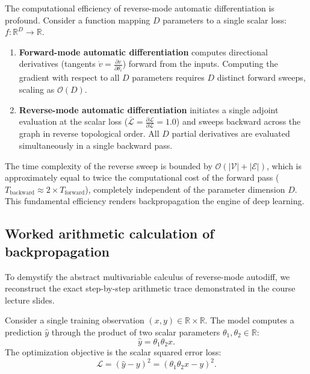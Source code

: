 \documentclass[../../../main.tex]{subfiles}
\begin{document}
The computational efficiency of reverse-mode automatic differentiation is profound. Consider a function mapping $D$ parameters to a single scalar loss: $f: \mathbb{R}^D \to \mathbb{R}$.
\begin{enumerate}[label=(\roman*)]
    \item \textbf{Forward-mode automatic differentiation} computes directional derivatives (tangents $\dot{v} = \frac{\partial v}{\partial \theta_i}$) forward from the inputs. Computing the gradient with respect to all $D$ parameters requires $D$ distinct forward sweeps, scaling as $\mathcal{O}(D)$.
    \item \textbf{Reverse-mode automatic differentiation} initiates a single adjoint evaluation at the scalar loss ($\bar{\mathcal{L}} = \frac{\partial \mathcal{L}}{\partial \mathcal{L}} = 1.0$) and sweeps backward across the graph in reverse topological order. All $D$ partial derivatives are evaluated simultaneously in a single backward pass.
\end{enumerate}
The time complexity of the reverse sweep is bounded by $\mathcal{O}(|\mathcal{V}| + |\mathcal{E}|)$, which is approximately equal to twice the computational cost of the forward pass ($T_{\text{backward}} \approx 2 \times T_{\text{forward}}$), completely independent of the parameter dimension $D$. This fundamental efficiency renders backpropagation the engine of deep learning.

\subsection{Worked arithmetic calculation of backpropagation}
\label{subsec:worked_backprop_arithmetic}

To demystify the abstract multivariable calculus of reverse-mode autodiff, we reconstruct the exact step-by-step arithmetic trace demonstrated in the course lecture slides.

Consider a single training observation $(x, y) \in \mathbb{R} \times \mathbb{R}$. The model computes a prediction $\hat{y}$ through the product of two scalar parameters $\theta_1, \theta_2 \in \mathbb{R}$:
\begin{equation}
\hat{y} = \theta_1 \theta_2 x.
\end{equation}
The optimization objective is the scalar squared error loss:
\begin{equation}
\mathcal{L} = \left( \hat{y} - y \right)^2 = \left( \theta_1 \theta_2 x - y \right)^2.
\end{equation}
\end{document}
